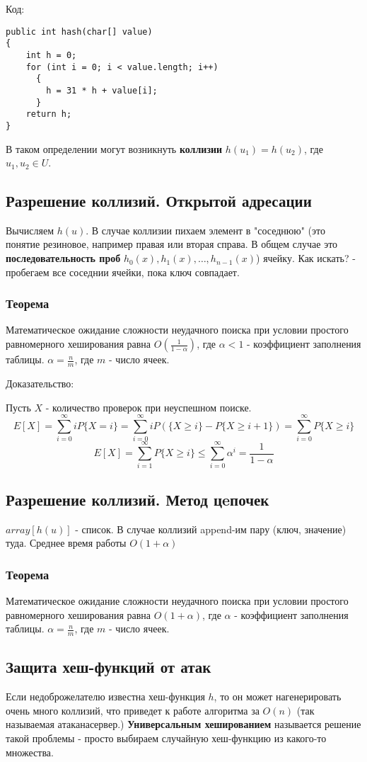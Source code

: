 Код:
\begin{verbatim}
public int hash(char[] value) 
{
    int h = 0;
    for (int i = 0; i < value.length; i++) 
      {
        h = 31 * h + value[i];
      }
    return h;
}
\end{verbatim}

В таком определении могут возникнуть {\bf коллизии} $h(u_1) = h(u_2)$, где $u_1, u_2 \in U$.

\subsection*{Разрешение коллизий. Открытой адресации}
Вычисляем $h(u)$. В случае коллизии пихаем элемент в "соседнюю" (это понятие резиновое, например правая или вторая справа. В общем случае это {\bf последовательность проб} $h_0(x), h_1(x), …, h_{n-1}(x)$) ячейку.
Как искать? - пробегаем все соседнии ячейки, пока ключ совпадает.

\subsubsection*{Теорема}
Математическое ожидание сложности неудачного поиска
при условии простого равномерного хеширования равна
$O(\frac{1}{1-\alpha})$, где $\alpha < 1$ - коэффициент заполнения таблицы.
$\alpha = \frac{n}{m}$, где $m$ - число ячеек. 

Доказательство:

Пусть $X$ - количество проверок при неуспешном поиске.
$$E[X] = \sum\limits_{i=0}^{\infty}iP\{X = i\} = \sum\limits_{i=0}^{\infty}iP(\{X\ge i\} - P\{X\ge i+1\}) = \sum\limits_{i=0}^{\infty}P\{X \ge i\}$$
$$E[X] = \sum\limits_{i=1}^{\infty}P\{X \ge i\}\le\sum\limits_{i=0}^{\infty}\alpha^i = \frac{1}{1-\alpha}$$ 

\subsection*{Разрешение коллизий. Метод цeпочек}
$array[h(u)]$ - список. В случае коллизий append-им пару (ключ, значение) туда. Среднее время работы $O(1 + \alpha)$

\subsubsection*{Теорема}
Математическое ожидание сложности неудачного поиска
при условии простого равномерного хеширования равна
$O(1 + \alpha)$, где $\alpha$ - коэффициент заполнения таблицы.
$\alpha = \frac{n}{m}$, где $m$ - число ячеек. 

\subsection*{Защита хеш-функций от атак}
Если недоброжелателю известна хеш-функция $h$, то он может нагенерировать очень много коллизий, что приведет к работе алгоритма за $O(n)$ (так называемая $атака на сервер.$)
{\bf Универсальным хешированием} называется решение такой проблемы - просто выбираем случайную хеш-функцию из какого-то множества.
